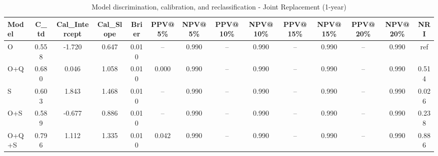 \begin{table}[htbp]
\centering
\small
\caption{Model discrimination, calibration, and reclassification - Joint Replacement (1-year)}
\label{tab:perf_joint_1y}
\begin{tabular}{lccccccccccccc}
\toprule
Model & C\_td & Cal\_Intercept & Cal\_Slope & Brier & PPV@5\% & NPV@5\% & PPV@10\% & NPV@10\% & PPV@15\% & NPV@15\% & PPV@20\% & NPV@20\% & NRI \\
\midrule
O & 0.558 & -1.720 & 0.647 & 0.010 & -- & 0.990 & -- & 0.990 & -- & 0.990 & -- & 0.990 & ref \\
O+Q & 0.680 & 0.046 & 1.058 & 0.010 & 0.000 & 0.990 & -- & 0.990 & -- & 0.990 & -- & 0.990 & 0.514 \\
S & 0.603 & 1.843 & 1.468 & 0.010 & -- & 0.990 & -- & 0.990 & -- & 0.990 & -- & 0.990 & 0.026 \\
O+S & 0.589 & -0.677 & 0.886 & 0.010 & -- & 0.990 & -- & 0.990 & -- & 0.990 & -- & 0.990 & 0.238 \\
O+Q+S & 0.796 & 1.112 & 1.335 & 0.010 & 0.042 & 0.990 & -- & 0.990 & -- & 0.990 & -- & 0.990 & 0.886 \\
\bottomrule
\end{tabular}
\end{table}